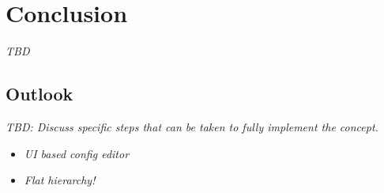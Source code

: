 \chapter{Conclusion}
\label{chap:conclusion}

\emph{TBD}

\section{Outlook}
\label{sec:outlook}
\emph{TBD: Discuss specific steps that can be taken to fully implement the concept.}
\begin{itemize}
    \item \emph{UI based config editor}
    \item \emph{Flat hierarchy!}
\end{itemize}